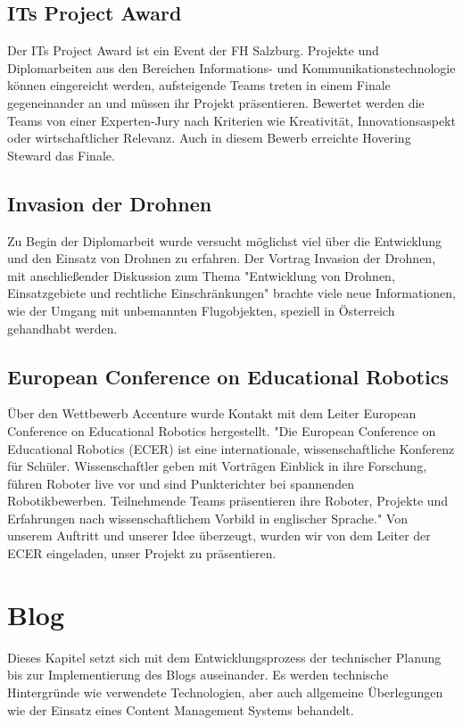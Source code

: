     \subsection*{ITs Project Award}
    Der {ITs Project Award\cite{its}} ist ein Event der FH Salzburg. Projekte und Diplomarbeiten aus den Bereichen Informations- und Kommunikationstechnologie
    können eingereicht werden, aufsteigende Teams treten in einem Finale gegeneinander an und müssen ihr Projekt präsentieren. Bewertet werden die
    Teams von einer Experten-Jury nach Kriterien wie Kreativität, Innovationsaspekt oder wirtschaftlicher Relevanz.
    Auch in diesem Bewerb erreichte Hovering Steward das Finale.

    \subsection*{Invasion der Drohnen}
    Zu Begin der Diplomarbeit wurde versucht möglichst viel über die Entwicklung und den Einsatz von Drohnen zu erfahren.
    Der Vortrag {Invasion der Drohnen\cite{invasionderdrohnen}}, mit anschließender Diskussion zum Thema "Entwicklung von Drohnen, Einsatzgebiete und rechtliche Einschränkungen" brachte
    viele neue Informationen, wie der Umgang mit unbemannten Flugobjekten, speziell in Österreich gehandhabt werden.

    \subsection*{European Conference on Educational Robotics}
    Über den Wettbewerb Accenture wurde Kontakt mit dem Leiter {European Conference on Educational Robotics\cite{ecer}} hergestellt.
    "Die European Conference on Educational Robotics (ECER) ist eine internationale, wissenschaftliche Konferenz für Schüler. Wissenschaftler
    geben mit Vorträgen Einblick in ihre Forschung, führen Roboter live vor und sind Punkterichter bei spannenden Robotikbewerben.
    Teilnehmende Teams präsentieren ihre Roboter, Projekte und Erfahrungen nach wissenschaftlichem
    Vorbild in englischer Sprache."
    Von unserem Auftritt und unserer Idee überzeugt, wurden wir von dem Leiter der ECER eingeladen, unser Projekt zu präsentieren.

\section{Blog}
Dieses Kapitel setzt sich mit dem Entwicklungsprozess der technischer Planung bis zur Implementierung
des Blogs auseinander. Es werden technische Hintergründe wie verwendete Technologien, aber
auch allgemeine Überlegungen wie der Einsatz eines Content Management Systems behandelt.

